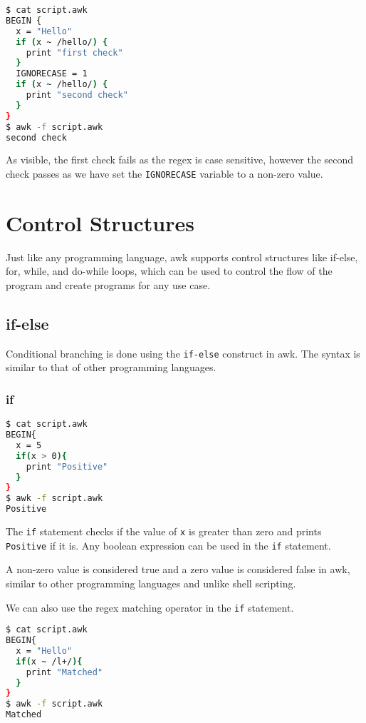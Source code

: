 \begin{lstlisting}[language=bash]
$ cat script.awk
BEGIN {
  x = "Hello"
  if (x ~ /hello/) {
    print "first check"
  }
  IGNORECASE = 1
  if (x ~ /hello/) {
    print "second check"
  }
}
$ awk -f script.awk
second check
\end{lstlisting}

As visible, the first check fails as the regex is case sensitive, however the second check passes as we have set the \lstinline|IGNORECASE| variable to a non-zero value.

\section{Control Structures}

Just like any programming language, awk supports control structures like if-else, for, while, and do-while loops, which can be used to control the flow of the program and create programs for any use case.

\subsection{if-else}

Conditional branching is done using the \lstinline|if-else| construct in awk. The syntax is similar to that of other programming languages.

\subsubsection{if}

\begin{lstlisting}[language=bash]
$ cat script.awk
BEGIN{
  x = 5
  if(x > 0){
    print "Positive"
  }
}
$ awk -f script.awk
Positive
\end{lstlisting}

The \lstinline|if| statement checks if the value of \lstinline|x| is greater than zero and prints \lstinline|Positive| if it is.
Any boolean expression can be used in the \lstinline|if| statement.

\begin{remark}
A non-zero value is considered true and a zero value is considered false in awk, similar to other programming languages and unlike shell scripting.
\end{remark}

We can also use the regex matching operator in the \lstinline|if| statement.

\begin{lstlisting}[language=bash]
$ cat script.awk
BEGIN{
  x = "Hello"
  if(x ~ /l+/){
    print "Matched"
  }
}
$ awk -f script.awk
Matched
\end{lstlisting}


